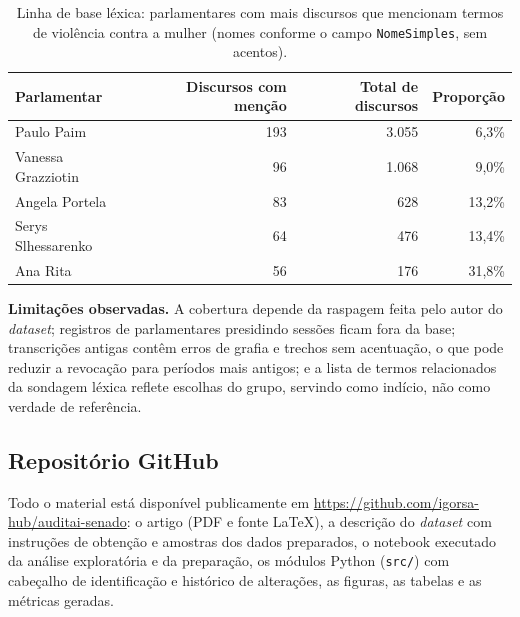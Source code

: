 \documentclass[12pt]{article}
\newcommand{\githuburl}{\url{https://github.com/igorsa-hub/auditai-senado}}
\begin{document}
\begin{table}[ht]
\centering
\caption{Linha de base léxica: parlamentares com mais discursos que mencionam termos de violência contra a mulher (nomes conforme o campo \texttt{NomeSimples}, sem acentos).}
\label{tab:baseline}
\footnotesize
\begin{tabular}{@{}lrrr@{}}
\toprule
\textbf{Parlamentar} & \textbf{Discursos com menção} & \textbf{Total de discursos} & \textbf{Proporção} \\
\midrule
Paulo Paim          & 193 & 3.055 & 6,3\% \\
Vanessa Grazziotin  & 96  & 1.068 & 9,0\% \\
Angela Portela      & 83  & 628   & 13,2\% \\
Serys Slhessarenko  & 64  & 476   & 13,4\% \\
Ana Rita            & 56  & 176   & 31,8\% \\
\bottomrule
\end{tabular}
\end{table}

\textbf{Limitações observadas.} A cobertura depende da raspagem feita pelo autor do
\textit{dataset}; registros de parlamentares presidindo sessões ficam fora da base; transcrições
antigas contêm erros de grafia e trechos sem acentuação, o que pode reduzir a revocação para
períodos mais antigos; e a lista de termos relacionados da sondagem léxica reflete escolhas do
grupo, servindo como indício, não como verdade de referência.

\subsection{Repositório GitHub}

Todo o material está disponível publicamente em \githuburl: o artigo (PDF e fonte
\LaTeX), a descrição do \textit{dataset} com instruções de obtenção e amostras dos dados
preparados, o notebook executado da análise exploratória e da preparação, os módulos Python
(\texttt{src/}) com cabeçalho de identificação e histórico de alterações, as figuras, as tabelas e
as métricas geradas.



\end{document}
